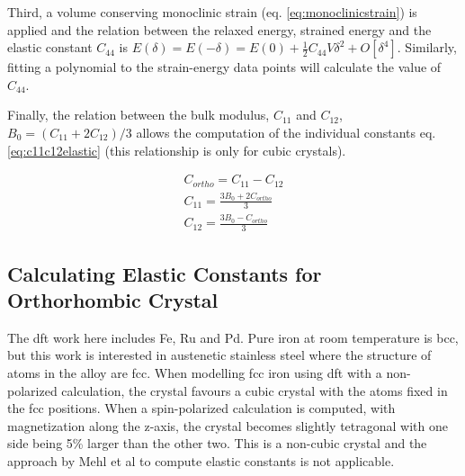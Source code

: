Third, a volume conserving monoclinic strain (eq. \ref{eq:monoclinicstrain}) is applied and the relation between the relaxed energy, strained energy and the elastic constant $C_{44}$ is $E(\delta) = E(-\delta) = E(0) + \frac{1}{2} C_{44} V \delta^2 + O[\delta^4]$.  Similarly, fitting a polynomial to the strain-energy data points will calculate the value of $C_{44}$.

Finally, the relation between the bulk modulus, $C_{11}$ and $C_{12}$, $B_0 = (C_{11} + 2 C_{12}) / 3$ allows the computation of the individual constants eq. \ref{eq:c11c12elastic} (this relationship is only for cubic crystals).

\begin{equation}
\begin{split}
C_{ortho} = C_{11} - C_{12} \\
C_{11} = \frac{3B_0 + 2 C_{ortho}}{3} \\
C_{12} = \frac{3B_0 - C_{ortho}}{3}
\end{split}
\label{eq:c11c12elastic}
\end{equation}



\subsection{Calculating Elastic Constants for Orthorhombic Crystal}
\label{section:calcelasticconstants}

The \acrshort{dft} work here includes Fe, Ru and Pd.  Pure iron at room temperature is \acrshort{bcc}, but this work is interested in austenetic stainless steel where the structure of atoms in the alloy are \acrshort{fcc}.  When modelling \acrshort{fcc} iron using \acrshort{dft} with a non-polarized calculation, the crystal favours a cubic crystal with the atoms fixed in the \acrshort{fcc} positions.  When a spin-polarized calculation is computed, with magnetization along the z-axis, the crystal becomes slightly tetragonal with one side being 5\% larger than the other two.  This is a non-cubic crystal and the approach by Mehl et al to compute elastic constants is not applicable.



